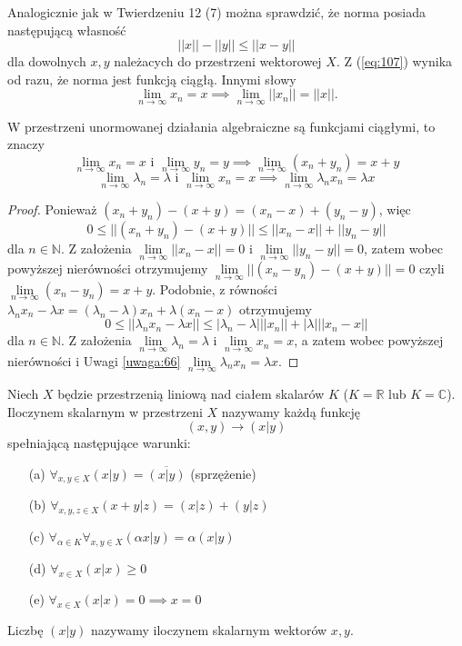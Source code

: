 \documentclass[leqno]{article}
\begin{document}
\begin{justify}
\begin{uwaga}
    Analogicznie jak w Twierdzeniu 12 (7) można sprawdzić, że norma posiada następującą własność 
    \begin{equation}\label{eq:107}
        ||x|| - ||y|| \leqslant ||x - y||
    \end{equation}
    dla dowolnych $x, y$ należacych do przestrzeni wektorowej $X$. Z (\ref{eq:107}) wynika od razu, że norma 
    jest funkcją ciągłą. Innymi słowy 
    \[
        \lim_{n \to \infty}x_n = x \implies \lim_{n \to \infty}||x_n|| = ||x||.
    \]
\end{uwaga}

\begin{theorem}
{
    W przestrzeni unormowanej działania algebraiczne są funkcjami ciągłymi, to znaczy
    \[
        \lim_{n\to\infty}x_n=x \text{ i } \lim_{n\to\infty}y_n=y \implies \lim_{n\to\infty}(x_n+y_n)=x+y
    \]
    \[
        \lim_{n\to\infty}\lambda_n =\lambda \text{ i } \lim_{n\to\infty}x_n =x \implies \lim_{n\to\infty}\lambda_n x_n=\lambda x 
    \]
}
\end{theorem}

\begin{proof}
    Ponieważ $(x_n+y_n)-(x+y)=(x_n-x)+(y_n-y)$, więc
    \[
        0\leq ||(x_n + y_n)-(x + y)|| \leq ||x_n - x||+||y_n - y||
    \]
    dla $n\in\mathbb{N}$.
    Z założenia $\lim\limits_{n \to \infty}||x_n - x|| = 0$ i $\lim\limits_{n \to \infty}||y_n - y|| = 0$, 
    zatem wobec powyższej nierówności otrzymujemy $\lim\limits_{n \to \infty} ||(x_n - y_n)-(x + y)|| = 0$ 
    czyli $\lim\limits_{n \to \infty}(x_n - y_n)= x + y$. Podobnie, z równości $\lambda_n x_n-\lambda x = (\lambda_n - \lambda)x_n+\lambda(x_n-x)$ otrzymujemy
    \[
        0\leq ||\lambda_n x_n-\lambda x||\leq |\lambda_n - \lambda| ||x_n||+|\lambda| ||x_n-x||
    \]
    dla $n \in \mathbb{N}$. Z założenia $\lim\limits_{n \to \infty}\lambda_n = \lambda \text{ i } \lim\limits_{n\to\infty}x_n = x$, 
    a zatem wobec powyższej nierówności i Uwagi \ref{uwaga:66} $\lim\limits_{n\to\infty}\lambda_n x_n=\lambda x$.
\end{proof}

\begin{defn}
    Niech \(X\) będzie przestrzenią liniową nad ciałem skalarów \(K\) (\(K=\mathbb{R}\) lub \(K=\mathbb{C}\)). Iloczynem skalarnym w przestrzeni \(X\) nazywamy każdą funkcję 
    \[(x,y)\to (x|y)\]
    spełniającą następujące warunki:
    \begin{enumerate}
        \item[(a)] \(\forall_{x,y\in X} (x|y)=\overline{(x|y)}\) (sprzężenie)
        \item[(b)] \(\forall_{x,y,z\in X} (x+y|z)=(x|z)+(y|z)\)
        \item[(c)] \(\forall_{\alpha\in K} \forall_{x,y\in X} (\alpha x|y)=\alpha(x|y)\)
        \item[(d)] \(\forall_{x\in X} (x|x)\geq 0\)
        \item[(e)] \(\forall_{x\in X} (x|x)=0 \implies x=0 \)
    \end{enumerate}
    Liczbę \((x|y)\) nazywamy iloczynem skalarnym wektorów \(x, y\).
\end{defn}


\end{justify}
\end{document}
